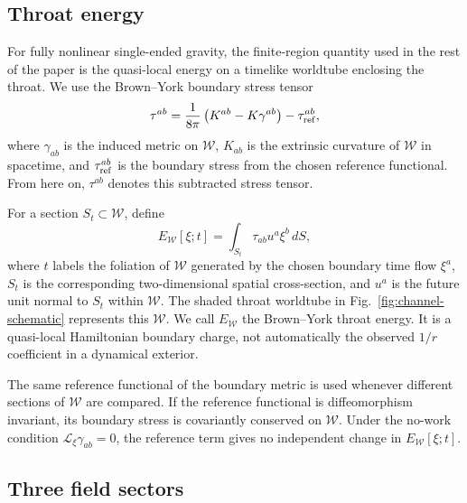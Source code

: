 \documentclass[aps,prd,10pt,onecolumn,nofootinbib,superscriptaddress,floatfix]{revtex4-2}
\begin{document}
\subsection{Throat energy}

For fully nonlinear single-ended gravity, the finite-region quantity used in
the rest of the paper is the quasi-local energy on a timelike worldtube
enclosing the throat.  We use the Brown--York boundary stress tensor
\cite{BrownYork1993Quasilocal,Szabados2009Quasilocal}
\begin{equation}
  \tau^{ab}
  =
  \frac{1}{8\pi}\left(K^{ab}-K\gamma^{ab}\right)
  -\tau_{\rm ref}^{ab},
\end{equation}
where $\gamma_{ab}$ is the induced metric on $\mathcal W$, $K_{ab}$ is the
extrinsic curvature of $\mathcal W$ in spacetime, and $\tau_{\rm ref}^{ab}$ is
the boundary stress from the chosen reference functional.  From here on,
$\tau^{ab}$ denotes this subtracted stress tensor.

For a section $S_t\subset\mathcal W$, define
\begin{equation}
  E_{\mathcal W}[\xi;t]
  =
  \int_{S_t}\tau_{ab}u^a\xi^b\,dS,
\end{equation}
where $t$ labels the foliation of $\mathcal W$ generated by the chosen boundary
time flow $\xi^a$, $S_t$ is the corresponding two-dimensional spatial
cross-section, and $u^a$ is the future unit normal to $S_t$ within
$\mathcal W$.  The shaded throat worldtube in
Fig.~\ref{fig:channel-schematic} represents this $\mathcal W$.  We call
$E_{\mathcal W}$ the Brown--York throat energy.  It is a quasi-local
Hamiltonian boundary charge, not automatically the observed $1/r$ coefficient
in a dynamical exterior.

The same reference functional of the boundary metric is used whenever
different sections of $\mathcal W$ are compared.  If the reference functional
is diffeomorphism invariant, its boundary stress is covariantly conserved on
$\mathcal W$.  Under the no-work condition $\mathcal L_\xi\gamma_{ab}=0$, the
reference term gives no independent change in $E_{\mathcal W}[\xi;t]$.

\subsection{Three field sectors}
\end{document}
